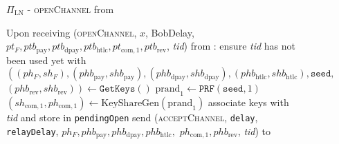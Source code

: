 \begin{figure}[!htbp]
\begin{protocolbox}{$\Pi_{\mathrm{LN}}$ - \textsc{openChannel} from \bob}
  \begin{algorithmic}[1]
    \State Upon receiving (\textsc{openChannel}, $x$, BobDelay, $pt_F,
    ptb_{\mathrm{pay}}, ptb_{\mathrm{dpay}}, ptb_{\mathrm{htlc}},
    pt_{\mathrm{com}, 1}, ptb_{\mathrm{rev}}$, \textit{tid}) from \bob:
    \Indent
      \State ensure \textit{tid} has not been used yet with \bob
      \State $\left(\left(ph_F, sh_F\right), \left(phb_{\mathrm{pay}},
      shb_{\mathrm{pay}}\right), \left(phb_{\mathrm{dpay}},
      shb_{\mathrm{dpay}}\right), \left(phb_{\mathrm{htlc}},
      shb_{\mathrm{htlc}}\right), \mathtt{seed},\right.$
      $\left.\left(phb_{\mathrm{rev}}, shb_{\mathrm{rev}}\right)\right) \gets
      \texttt{GetKeys}\left(\right)$
      \State $\mathrm{prand}_1 \gets \texttt{PRF}\left(\mathtt{seed}, 1\right)$
      \State $\left(sh_{\mathrm{com}, 1}, ph_{\mathrm{com}, 1}\right) \gets
      \mathrm{KeyShareGen}\left(\mathrm{prand}_1\right)$
      \State associate keys with \textit{tid} and store in \texttt{pendingOpen}
      \State send (\textsc{acceptChannel}, \texttt{delay}, \texttt{relayDelay},
      $ph_F, phb_{\mathrm{pay}}, phb_{\mathrm{dpay}}, phb_{\mathrm{htlc}},$
      $ph_{\mathrm{com}, 1}, phb_{\mathrm{rev}}$, \textit{tid}) to \bob{}
    \EndIndent
  \end{algorithmic}
\end{protocolbox}
\caption{}
\label{alg:protocol:open:openChannel}
\end{figure}

